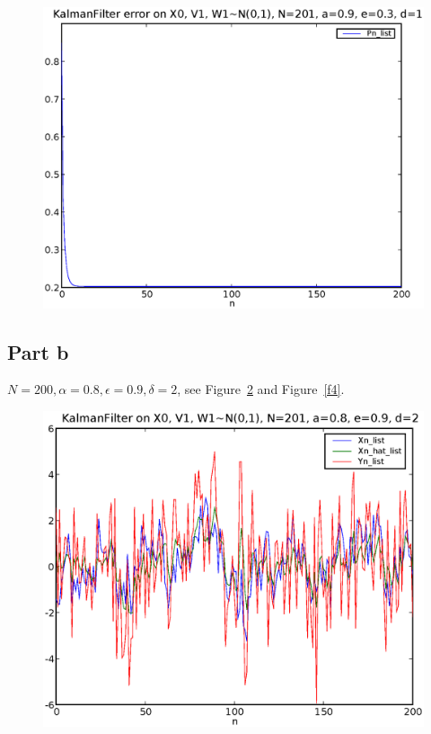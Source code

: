 \documentclass[a4paper,10pt]{article}
\begin{document}
\begin{figure}
\includegraphics[width=1\textwidth]{hw10_1_error_N_201_a_0.9_e_0.3_d_1.eps}
\caption{}\label{f2}
\end{figure}


\subsection{Part b}
$N=200, \alpha=0.8, \epsilon=0.9, \delta=2$, see Figure~\ref{f3} and Figure~\ref{f4}.

\begin{figure}
\includegraphics[width=1\textwidth]{hw10_1_N_201_a_0.8_e_0.9_d_2.eps}
\caption{}\label{f3}
\end{figure}
\end{document}
